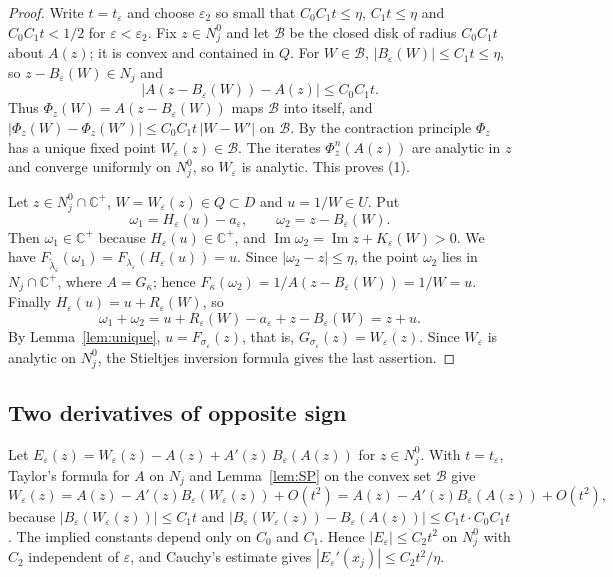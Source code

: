 \documentclass[11pt]{amsart}
\numberwithin{equation}{section}
\theoremstyle{definition}
\theoremstyle{remark}
\newcommand{\Cp}{\mathbb C^{+}}
\renewcommand{\Im}{\operatorname{Im}}
\begin{document}
\begin{proof}
Write $t=t_\varepsilon$ and choose $\varepsilon_2$ so small that $C_0C_1t\le\eta$, $C_1t\le\eta$ and $C_0C_1t<1/2$ for $\varepsilon<\varepsilon_2$. Fix $z\in N_j^0$ and let $\mathcal B$ be the closed disk of radius $C_0C_1t$ about $A(z)$; it is convex and contained in $Q$. For $W\in\mathcal B$, $|B_\varepsilon(W)|\le C_1t\le\eta$, so $z-B_\varepsilon(W)\in N_j$ and
\[
\bigl|A(z-B_\varepsilon(W))-A(z)\bigr|\le C_0C_1t .
\]
Thus $\Phi_z(W)=A(z-B_\varepsilon(W))$ maps $\mathcal B$ into itself, and $|\Phi_z(W)-\Phi_z(W')|\le C_0C_1t\,|W-W'|$ on $\mathcal B$. By the contraction principle $\Phi_z$ has a unique fixed point $W_\varepsilon(z)\in\mathcal B$. The iterates $\Phi_z^n(A(z))$ are analytic in $z$ and converge uniformly on $N_j^0$, so $W_\varepsilon$ is analytic. This proves (1).

Let $z\in N_j^0\cap\Cp$, $W=W_\varepsilon(z)\in Q\subset D$ and $u=1/W\in U$. Put
\[
\omega_1=H_\varepsilon(u)-a_\varepsilon,\qquad \omega_2=z-B_\varepsilon(W).
\]
Then $\omega_1\in\Cp$ because $H_\varepsilon(u)\in\Cp$, and $\Im\omega_2=\Im z+K_\varepsilon(W)>0$. We have $F_{\tilde\lambda_\varepsilon}(\omega_1)=F_{\lambda_\varepsilon}(H_\varepsilon(u))=u$. Since $|\omega_2-z|\le\eta$, the point $\omega_2$ lies in $N_j\cap\Cp$, where $A=G_\kappa$; hence $F_\kappa(\omega_2)=1/A(z-B_\varepsilon(W))=1/W=u$. Finally $H_\varepsilon(u)=u+R_\varepsilon(W)$, so
\[
\omega_1+\omega_2=u+R_\varepsilon(W)-a_\varepsilon+z-B_\varepsilon(W)=z+u .
\]
By Lemma~\ref{lem:unique}, $u=F_{\sigma_\varepsilon}(z)$, that is, $G_{\sigma_\varepsilon}(z)=W_\varepsilon(z)$. Since $W_\varepsilon$ is analytic on $N_j^0$, the Stieltjes inversion formula gives the last assertion.
\end{proof}

\subsection{Two derivatives of opposite sign}
Let $E_\varepsilon(z)=W_\varepsilon(z)-A(z)+A'(z)\,B_\varepsilon(A(z))$ for $z\in N_j^0$. With $t=t_\varepsilon$, Taylor's formula for $A$ on $N_j$ and Lemma~\ref{lem:SP} on the convex set $\mathcal B$ give
\[
W_\varepsilon(z)=A(z)-A'(z)B_\varepsilon(W_\varepsilon(z))+O(t^2)=A(z)-A'(z)B_\varepsilon(A(z))+O(t^2),
\]
because $|B_\varepsilon(W_\varepsilon(z))|\le C_1t$ and $|B_\varepsilon(W_\varepsilon(z))-B_\varepsilon(A(z))|\le C_1t\cdot C_0C_1t$. The implied constants depend only on $C_0$ and $C_1$. Hence $|E_\varepsilon|\le C_2t^2$ on $N_j^0$ with $C_2$ independent of $\varepsilon$, and Cauchy's estimate gives $|E_\varepsilon'(x_j)|\le C_2t^2/\eta$.
\end{document}
